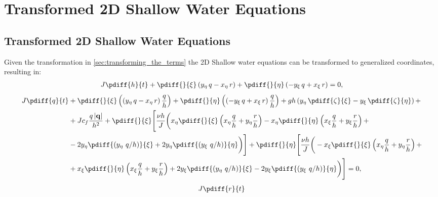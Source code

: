 {{
\color{gray}
\chapter{Transformed 2D Shallow Water Equations}
\section{Transformed 2D Shallow Water Equations}

Given the transformation in \autoref{sec:transforming_the_terms} the 2D Shallow water equations can be transformed to generalized coordinates, resulting in:
%
	\begin{align}\label{CurviContinuity_Expanded}
		J \pdiff{h}{t} +\pdiff{}{\xi} \left( y_{\eta}\, q - x_{\eta}\, r \right) + \pdiff{}{\eta} \left( -y_{\xi}\, q + x_{\xi}\, r \right) = 0,
	\end{align}
	\begin{align}\label{CurviXmom_Expanded}
		\begin{aligned}
			J \pdiff{q}{t}
			&+ \pdiff{}{\xi} \left( \left(y_{\eta}\, q - x_{\eta}\, r \right) \frac{q}{h}\right)
			+ \pdiff{}{\eta} \left(\left( -y_{\xi}\, q + x_{\xi}\, r \right)\frac{q}{h}\right)
			+ g h \left( y_{\eta}\, \pdiff{\zeta}{\xi} - y_{\xi}\, \pdiff{\zeta}{\eta} \right) +
            \\
			&+ J c_f \frac{q\, |\mathbf{q}|}{h^2}
			+ \pdiff{}{\xi}\Bigg[ \frac{\nu h}{J} \bigg(
			x_{\eta} \pdiff{}{\xi}\left( x_{\eta}\frac{q}{h} + y_{\eta}\frac{r}{h}  \right)
			- x_{\eta} \pdiff{}{\eta}\left( x_{\xi} \frac{q}{h} + y_{\xi} \frac{r}{h}  \right) +
            \\
			& - 2 y_{\eta}  \pdiff{(y_{\eta}\ q/h)}{\xi}
			+ 2 y_{\eta}  \pdiff{(y_{\xi}\ q/h)}{\eta} \bigg)\Bigg]
			+ \pdiff{}{\eta}\Bigg[ \frac{\nu h}{J} \bigg(
			- x_{\xi} \pdiff{}{\xi}\left( x_{\eta}\frac{q}{h} + y_{\eta}\frac{r}{h}  \right) +
            \\
			&+ x_{\xi} \pdiff{}{\eta}\left( x_{\xi} \frac{q}{h} + y_{\xi} \frac{r}{h}  \right)
			+ 2 y_{\xi} \pdiff{(y_{\eta}\ q/h)}{\xi}
			- 2 y_{\xi} \pdiff{(y_{\xi}\ q/h)}{\eta} \bigg) \Bigg] = 0,
		\end{aligned}
	\end{align}
	\begin{align}\label{CurviYmom_Expanded}
		\begin{aligned}
			J \pdiff{r}{t}

\end{aligned}
\end{align}}}
